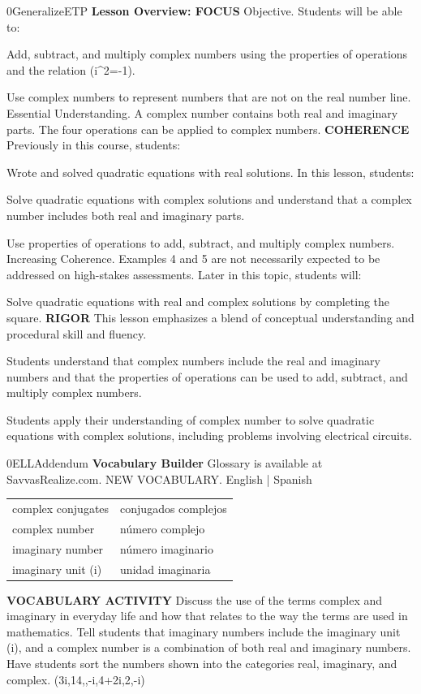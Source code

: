 \documentclass{article}
\newenvironment{te-addendum}[2]{}{}     %
\newcommand{\answer}[1]{}               %
\newcommand{\te}[1]{}                   %
\begin{document}
\begin{te-addendum}{0}{GeneralizeETP}
\textbf{Lesson Overview: FOCUS}
Objective. Students will be able to:
\item Add, subtract, and multiply complex numbers using the properties of operations and the relation (i^2=-1).
\item Use complex numbers to represent numbers that are not on the real number line.
Essential Understanding. A complex number contains both real and imaginary parts. The four operations can be applied to complex numbers.
\textbf{COHERENCE}
Previously in this course, students:
\item Wrote and solved quadratic equations with real solutions.
In this lesson, students:
\item Solve quadratic equations with complex solutions and understand that a complex number includes both real and imaginary parts.
\item Use properties of operations to add, subtract, and multiply complex numbers.
Increasing Coherence. Examples 4 and 5 are not necessarily expected to be addressed on high-stakes assessments.
Later in this topic, students will:
\item Solve quadratic equations with real and complex solutions by completing the square.
\textbf{RIGOR}
This lesson emphasizes a blend of conceptual understanding and procedural skill and fluency.
\item Students understand that complex numbers include the real and imaginary numbers and that the properties of operations can be used to add, subtract, and multiply complex numbers.
\item Students apply their understanding of complex number to solve quadratic equations with complex solutions, including problems involving electrical circuits.
\te{SavvasRealize.com. Program Resources.}
\end{te-addendum}
\begin{te-addendum}{0}{ELLAddendum}
\textbf{Vocabulary Builder}
Glossary is available at SavvasRealize.com.
NEW VOCABULARY. English | Spanish
\begin{tabular}{ll}
complex conjugates & conjugados complejos \\
complex number & número complejo \\
imaginary number & número imaginario \\
imaginary unit (i) & unidad imaginaria \\
\end{tabular}
\textbf{VOCABULARY ACTIVITY}
Discuss the use of the terms complex and imaginary in everyday life and how that relates to the way the terms are used in mathematics. Tell students that imaginary numbers include the imaginary unit (i), and a complex number is a combination of both real and imaginary numbers. Have students sort the numbers shown into the categories real, imaginary, and complex.
(3i,14,,-i,4+2i,2,-i)
\answer{Real: [14, (\sqrt{2}), (2\sqrt{3})]. Imaginary: [(3i), (-i)]. Complex: [(4+2i), (\sqrt{7}-i)].}
\end{te-addendum}
\end{document}
